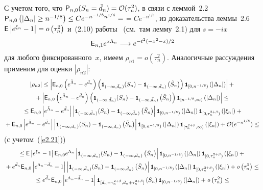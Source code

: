 С учетом того, что ${{\sf P}}_{n,0}(S_n=\bar d_n)={\cal O}(\tau_n^2)$,
в связи с леммой~2.2
${{\sf P}}_{n,0}\left(\left|\Delta_n\right|\geq n^{-1/8}\right)\leq
Ce^{-n^{-1/8}n^{1/4}}=$\linebreak $=Ce^{-n^{1/8}}$, из доказательства леммы~2.6
${{\sf E}}\left|e^{\xi_n}-1\right|= o\left(\tau_n^2\right)$
и~(2.10) работы~\cite{3ben} (см.\ там лемму~2.1) для $s=-ix$
$$
{{\sf E}}_{n,1}e^{x\Lambda_n}\longrightarrow e^{-{t^2(-x^2-x)}/2}
$$
для любого фиксированного~$x$, имеем $\rho_{n1}= o\left(\tau_n^2\right)$.
Аналогичные рассуждения применим для оценки $|\rho_{n2}|$:
\begin{multline*}
|\rho_{n2}|\leq\left| {\e}_{n,0}\left(e^{\tilde \Lambda_n}-e^{\bar d_n}\right)
\left({\Ik}_{(-\infty,\bar d_n)}(S_n)-{\Ik}_{(-\infty,\bar d_n)}\left(\tilde S_n\right)\right){\Ik}_{[0,n^{-1/8})}
\left(\left|\Delta_n\right|\right) \right|+{}\\
{}+
\left| {\e}_{n,0}\left(e^{\tilde \Lambda_n}-e^{\bar d_n}\right)
\left({\Ik}_{(-\infty,\bar d_n)}(S_n)-{\Ik}_{(-\infty,\bar d_n)}\left(\tilde S_n\right)\right){\Ik}_{[n^{-1/8},\infty)}
\left(|\Delta_n|\right)  \right|\leq{}\\
{}
\leq {\e}_{n,0}\left|e^{\tilde \Lambda_n}-e^{\bar d_n}\right|
\left|{\Ik}_{(-\infty,\bar d_n)}(S_n)-{\Ik}_{(-\infty,\bar d_n)}\left(\tilde S_n\right)\right|
{\Ik}_{[0,n^{-1/8})}\left(|\Delta_n|\right){\Ik}_{[0,\tau_n^{2+\beta})}\left(|\xi_n|\right)+{}\\
{}
+{\e}_{n,0}\left|e^{\tilde \Lambda_n}-e^{\bar d_n}\right|
\left|{\Ik}_{(-\infty,\bar d_n)}(S_n)-{\Ik}_{(-\infty,\bar d_n)}\left(\tilde S_n\right)\right|
{\Ik}_{[0,n^{-1/8})}\left(\left|\Delta_n\right|\right){\Ik}_{[\tau_n^{2+\beta},\infty)}\left(\left|\xi_n\right|\right)+
{\cal O}(e^{-n^{1/8}})\leq{}
\end{multline*}
(с учетом~(\ref{e2.21}))
\begin{multline*}
\leq {\e}\left|e^{\xi_n}-1\right|{\e}_{n,0}e^{\Lambda_n}
\left|{\Ik}_{(-\infty,\bar d_n)}(S_n)-{\Ik}_{(-\infty,\bar d_n)}\left(
\tilde S_n\right)\right|{\Ik}_{[0,n^{-1/8})}\left(
\left|\Delta_n\right|\right){\Ik}_{[0,\tau_n^{2+\beta})}\left(\left|\xi_n\right|\right)+{}\\
{}
+ e^{\bar d_n}{\e}_{n,0}\left| e^{\Lambda_n-\bar d_n}-1\right|
\left|{\Ik}_{(-\infty,\bar d_n)}(S_n)-{\Ik}_{(-\infty,\bar d_n)}\left(
\tilde S_n\right)\right|{\Ik}_{[0,n^{-1/8})}\left(\left|\Delta_n\right|\right)
{\Ik}_{[0,\tau_n^{2+\beta})}\left(\left|\xi_n\right|\right)+
{\it o}\left(\tau_n^2\right)\leq{}
\\
{}
\leq e^{\bar d_n}{\e}_{n,0}\left| e^{\Lambda_n-\bar d_n}-1\right|
{\Ik}_{[\bar d_n-\tau_n^{2+\beta},\bar d_n+\tau_n^{2+\beta}]}\left(S_n\right)
{\Ik}_{[0,n^{-1/8})}\left(\left|\Delta_n\right| \right)+{\it o}\left(\tau_n^2\right)\leq{}
\end{multline*}

